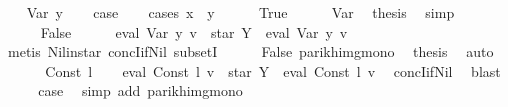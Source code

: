 \begin{isabellebody}
\ \ \isamarkupfalse%
\ {\isacharparenleft}{\kern0pt}Var\ y{\isacharparenright}{\kern0pt}\isanewline
\ \ \isamarkupfalse%
\ {\isacharquery}{\kern0pt}case\isanewline
\ \ \isamarkupfalse%
\ {\isacharparenleft}{\kern0pt}cases\ {\isachardoublequoteopen}x\ {\isacharequal}{\kern0pt}\ y{\isachardoublequoteclose}{\isacharparenright}{\kern0pt}\isanewline
\ \ \ \ \isamarkupfalse%
\ True\isanewline
\ \ \ \ \isamarkupfalse%
\ Var\ \isamarkupfalse%
\ {\isacharquery}{\kern0pt}thesis\ \isamarkupfalse%
\ simp\isanewline
\ \ \isamarkupfalse%
\isanewline
\ \ \ \ \isamarkupfalse%
\ False\isanewline
\ \ \ \ \isamarkupfalse%
\ {\isachardoublequoteopen}eval\ {\isacharparenleft}{\kern0pt}Var\ y{\isacharparenright}{\kern0pt}\ v\ {\isasymsubseteq}\ star\ Y\ {\isacharat}{\kern0pt}{\isacharat}{\kern0pt}\ eval\ {\isacharparenleft}{\kern0pt}Var\ y{\isacharparenright}{\kern0pt}\ v{\isachardoublequoteclose}\ \isamarkupfalse%
\ {\isacharparenleft}{\kern0pt}metis\ Nil{\isacharunderscore}{\kern0pt}in{\isacharunderscore}{\kern0pt}star\ concI{\isacharunderscore}{\kern0pt}if{\isacharunderscore}{\kern0pt}Nil{}\ subsetI{\isacharparenright}{\kern0pt}\isanewline
\ \ \ \ \isamarkupfalse%
\ False\ parikh{\isacharunderscore}{\kern0pt}img{\isacharunderscore}{\kern0pt}mono\ \isamarkupfalse%
\ {\isacharquery}{\kern0pt}thesis\ \isamarkupfalse%
\ auto\isanewline
\ \ \isamarkupfalse%
\isanewline
{}\isamarkupfalse%
\isanewline
\ \ \isamarkupfalse%
\ {\isacharparenleft}{\kern0pt}Const\ l{\isacharparenright}{\kern0pt}\isanewline
\ \ \isamarkupfalse%
\ {\isachardoublequoteopen}eval\ {\isacharparenleft}{\kern0pt}Const\ l{\isacharparenright}{\kern0pt}\ v\ {\isasymsubseteq}\ star\ Y\ {\isacharat}{\kern0pt}{\isacharat}{\kern0pt}\ eval\ {\isacharparenleft}{\kern0pt}Const\ l{\isacharparenright}{\kern0pt}\ v{\isachardoublequoteclose}\ \isamarkupfalse%
\ concI{\isacharunderscore}{\kern0pt}if{\isacharunderscore}{\kern0pt}Nil{}\ \isamarkupfalse%
\ blast\isanewline
\ \ \isamarkupfalse%
\ \isamarkupfalse%
\ {\isacharquery}{\kern0pt}case\ \isamarkupfalse%
\ {\isacharparenleft}{\kern0pt}simp\ add{\isacharcolon}{\kern0pt}\ parikh{\isacharunderscore}{\kern0pt}img{\isacharunderscore}{\kern0pt}mono{\isacharparenright}{\kern0pt}\isanewline

\end{isabellebody}
